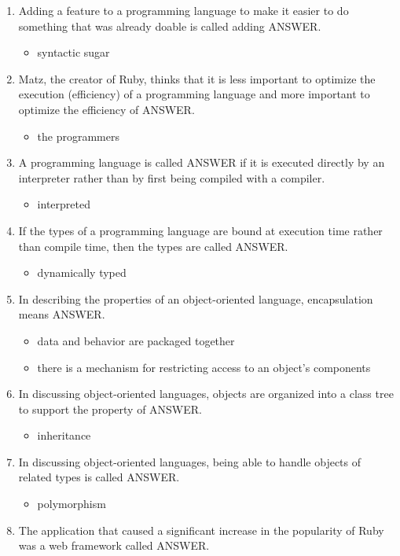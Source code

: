 \documentclass{exam}
\begin{document}
\begin{enumerate}
\item Adding a feature to a programming language to make it easier to do something that was already doable is called adding ANSWER.
\begin{itemize}
\item syntactic sugar
\end{itemize}
\item Matz, the creator of Ruby, thinks that it is less important to optimize the execution (efficiency) of a programming language and more important to optimize the efficiency of ANSWER.
\begin{itemize}
\item the programmers
\end{itemize}
\item A programming language is called ANSWER if it is executed directly by an interpreter rather than by first being compiled with a compiler.
\begin{itemize}
\item interpreted
\end{itemize}
\item If the types of a programming language are bound at execution time rather than compile time, then the types are called ANSWER.
\begin{itemize}
\item dynamically typed
\end{itemize}
\item In describing the properties of an object-oriented language, encapsulation means ANSWER.
\begin{itemize}
\item data and behavior are packaged together
\item there is a mechanism for restricting access to an object's components
\end{itemize}
\item In discussing object-oriented languages, objects are organized into a class tree to support the property of ANSWER.
\begin{itemize}
\item inheritance
\end{itemize}
\item In discussing object-oriented languages, being able to handle objects of related types is called ANSWER.
\begin{itemize}
\item polymorphism
\end{itemize}
\item The application that caused a significant increase in the popularity of Ruby was a web framework called ANSWER.

\end{enumerate}
\end{document}
